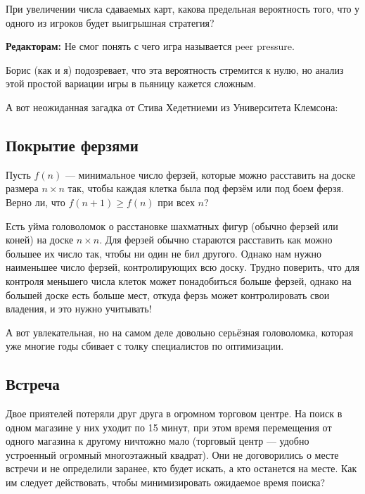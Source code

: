 При увеличении числа сдаваемых карт,
какова предельная вероятность того, что у одного из игроков будет выигрышная стратегия?

\begin{addedbytheeditors}
\textbf{Редакторам:} Не смог понять с чего игра называется peer pressure.
\end{addedbytheeditors}

\medskip

Борис (как и я) подозревает, что эта вероятность стремится к нулю, но анализ этой простой вариации игры в пьяницу кажется сложным.

\medskip

А вот неожиданная загадка от Стива Хедетниеми из Университета Клемсона:

\subsection*{Покрытие ферзями}

Пусть $f(n)$ --- минимальное число ферзей, которые можно расставить на доске размера $n \times n$ так, чтобы каждая клетка была под ферзём или под боем ферзя.
Верно ли, что $f(n + 1) \geqslant f(n)$ при всех $n$?

\medskip

Есть уйма головоломок о расстановке шахматных фигур (обычно ферзей или коней) на доске $n \times n$.
Для ферзей обычно стараются расставить как можно большее их число так, чтобы ни один не бил другого.
Однако нам нужно наименьшее число ферзей, контролирующих всю доску.
Трудно поверить, что для контроля меньшего числа клеток может понадобиться больше ферзей, однако на большей доске есть больше мест, откуда ферзь может контролировать свои владения, и это нужно учитывать!

\medskip

А вот увлекательная, но на самом деле довольно серьёзная головоломка, которая уже многие годы сбивает с толку специалистов по оптимизации.

\subsection*{Встреча}

Двое приятелей потеряли друг друга в огромном торговом центре. %
На поиск в одном магазине у них уходит по 15 минут,
при этом время перемещения от одного магазина к другому ничтожно мало
(торговый центр --- удобно устроенный огромный многоэтажный квадрат).
Они не договорились о месте встречи и не определили заранее, кто будет искать, а кто останется на месте.
Как им следует действовать, чтобы минимизировать ожидаемое время поиска?

